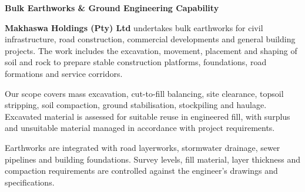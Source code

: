 \hypertarget{sec:earthworks}{}

\noindent
\begin{minipage}[t]{0.62\textwidth}
    \vspace{0pt}
    {\large\bfseries\color{mhnavy} Bulk Earthworks \& Ground Engineering Capability}
    \vspace{0.12cm}

    {\fontsize{9pt}{13pt}\selectfont\color{mhtext}
    \textbf{Makhaswa Holdings (Pty) Ltd} undertakes bulk earthworks for civil infrastructure, road construction, commercial developments and general building projects. The work includes the excavation, movement, placement and shaping of soil and rock to prepare stable construction platforms, foundations, road formations and service corridors.
    }

    \vspace{0.22cm}

    {\fontsize{9pt}{13pt}\selectfont\color{mhtext}
    Our scope covers mass excavation, cut-to-fill balancing, site clearance, topsoil stripping, soil compaction, ground stabilisation, stockpiling and haulage. Excavated material is assessed for suitable reuse in engineered fill, with surplus and unsuitable material managed in accordance with project requirements.
    }

    \vspace{0.22cm}

    {\fontsize{9pt}{13pt}\selectfont\color{mhtext}
    Earthworks are integrated with road layerworks, stormwater drainage, sewer pipelines and building foundations. Survey levels, fill material, layer thickness and compaction requirements are controlled against the engineer's drawings and specifications.
    }
\end{minipage}
\hfill
